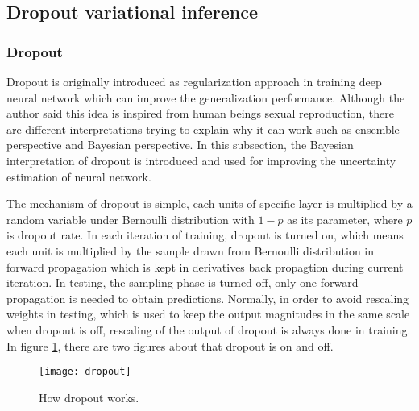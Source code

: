\subsection{Dropout variational inference}
\subsubsection{Dropout}
Dropout\cite{srivastava2014dropout} is originally introduced as regularization approach in training deep neural network which can improve the generalization performance. Although the author said this idea is inspired from human beings sexual reproduction, there are different interpretations trying to explain why it can work such as ensemble perspective and Bayesian perspective. In this subsection, the Bayesian interpretation of dropout is introduced and used for improving the uncertainty estimation of neural network. 

The mechanism of dropout is simple, each units of specific layer is multiplied by a random variable under Bernoulli distribution with $1-p$ as its parameter, where $p$ is dropout rate. In each iteration of training, dropout is turned on, which means each unit is multiplied by the sample drawn from Bernoulli distribution in forward propagation which is kept in  derivatives back propagtion during current iteration. In testing, the sampling phase is turned off, only one forward propagation is needed to obtain predictions. Normally, in order to avoid rescaling weights in testing, which is used to keep the output magnitudes in the same scale when dropout is off, rescaling of the output of dropout is always done in training. In figure \ref{fig:dropout}, there are two figures about that dropout is on and off. 
\begin{figure}[H]
	\begin{center}
		\texttt{[image: dropout]}
		\caption{How dropout works\cite{srivastava2014dropout}.}		
		\label{fig:dropout}
	\end{center}
\end{figure}


